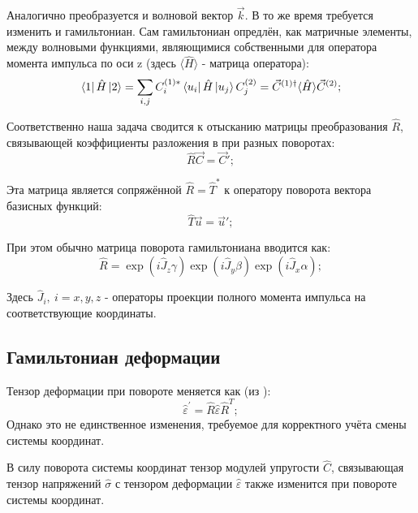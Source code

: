 \documentclass[../main.tex]{subfiles}
\begin{document}
    Аналогично преобразуется и волновой вектор $\vec k$. В то же время требуется изменить и 
    гамильтониан. Сам гамильтониан опредлён, как матричные элементы, между волновыми функциями,
    являющимися собственными для оператора момента импульса по оси z (здесь $\langle \hat H \rangle$
    - матрица оператора):
    \begin{equation*}
        \bra{1} \hat H \ket{2} = \sum_{i,j} C^{(1) *}_i \bra{u_i} \hat H \ket{u_j} C^{(2)}_j
            = \vec{C}^{(1) \dagger} \langle \hat H \rangle \vec{C}^{(2)};
    \end{equation*}

    Соответственно наша задача сводится к отысканию матрицы преобразования $\hat R$,
    связывающей коэффициенты разложения в при разных поворотах:
    \begin{equation*}
        \hat R \vec{C} = \vec{C}';
    \end{equation*}

    Эта матрица является сопряжённой $\hat R = \hat T ^{*}$ к оператору поворота вектора
    базисных функций:
    \begin{equation*}
        \hat T \vec{u} = \vec{u}';
    \end{equation*}

    При этом обычно матрица поворота гамильтониана вводится как:
    \begin{equation}
        \hat R = \exp(i\hat{J}_z \gamma) \exp(i\hat{J}_y \beta) \exp(i\hat{J}_x \alpha);
    \end{equation}

    Здесь $\hat{J}_i,~i = x, y, z$ - операторы проекции полного момента импульса на соответствующие
    координаты.

    \subsection{Гамильтониан деформации}

    Тензор деформации при повороте меняется как (из \cite{Landau:Upr:1965}):
    \begin{equation}
        \hat{\varepsilon}^{'} = \hat{R} \hat{\varepsilon} \hat{R}^T;
    \end{equation}
    Однако это не единственное изменения, требуемое для корректного учёта смены системы координат.

    В силу поворота системы координат тензор модулей упругости $\hat C$, связывающая тензор напряжений $\hat \sigma$ 
    с тензором деформации $\hat \varepsilon$ также изменится при повороте системы координат.
\end{document}
